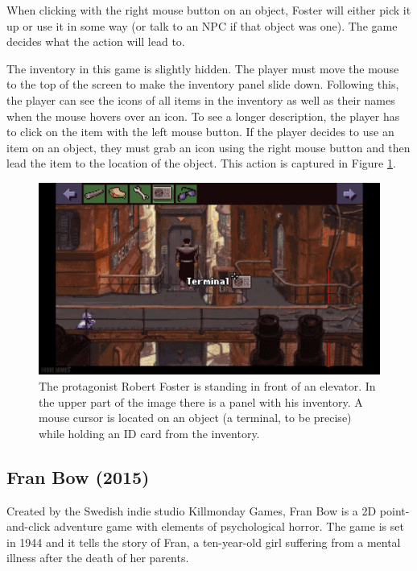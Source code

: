 When clicking with the right mouse button on an object, Foster will either pick it up or use it in some way (or talk to an NPC if that object was one). The game decides what the action will lead to.

The inventory in this game is slightly hidden. The player must move the mouse to the top of the screen to make the inventory panel slide down. Following this, the player can see the icons of all items in the inventory as well as their names when the mouse hovers over an icon. To see a longer description, the player has to click on the item with the left mouse button. If the player decides to use an item on an object, they must grab an icon using the right mouse button and then lead the item to the location of the object. This action is captured in Figure \ref{fig:BaSS}.


\begin{figure}[H]
\centering
\includegraphics[width=1.\linewidth]{img/BaSS.png}
\caption{The protagonist Robert Foster is standing in front of an elevator. In the upper part of the image there is a panel with his inventory. A mouse cursor is located on an object (a terminal, to be precise) while holding an ID card from the inventory.}
\label{fig:BaSS}
\end{figure}

\subsection{Fran Bow (2015)}
Created by the Swedish indie studio Killmonday Games, Fran Bow is a 2D point-and-click adventure game with elements of psychological horror. The game is set in 1944 and it tells the story of Fran, a ten-year-old girl suffering from a mental illness after the death of her parents.

